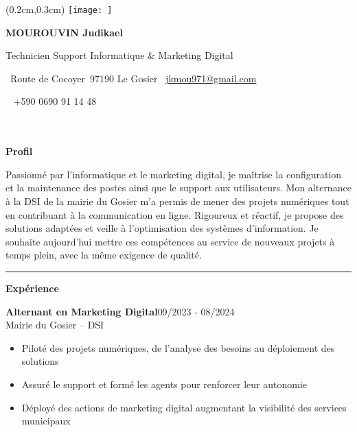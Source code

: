 \documentclass[a4paper]{article}
\renewcommand{\colorbox}[2]{#2}%
\newcommand{\fullrule}{\hspace{-1.5cm}\rule{\paperwidth}{0.4pt}}
\newcommand{\cvsection}[1]{%
  \vspace{6pt}\textbf{\Large #1}\par\vspace{2pt}}
\begin{document}
\color{white}
\ifx\relax\relax\else
\begin{textblock*}{4cm}(0.2cm,0.3cm)
  \texttt{[image: ]}
\end{textblock*}
 \fi
\begin{center}
  {\fontsize{44pt}{24pt}\selectfont\bfseries MOUROUVIN Judikael}

  \bigskip
  {\Large Technicien Support Informatique \& Marketing Digital}

  \bigskip\bigskip
  \faMapMarker~Route de Cocoyer\ 97190 Le Gosier
  \quad\faEnvelope~\href{mailto:jkmou971@gmail.com}{jkmou971@gmail.com}

  \bigskip
  \faPhone~ +590 0690 91 14 48
  \quad \faLinkedin\ \href{}{}
 

  \vspace{-0.3cm}
  
\end{center}
\\ \\
\cvsection{Profil}

Passionné par l’informatique et le marketing digital, je maîtrise la configuration et la maintenance des postes ainsi que le support aux utilisateurs. Mon alternance à la DSI de la mairie du Gosier m’a permis de mener des projets numériques tout en contribuant à la communication en ligne. Rigoureux et réactif, je propose des solutions adaptées et veille à l’optimisation des systèmes d’information. Je souhaite aujourd’hui mettre ces compétences au service de nouveaux projets à temps plein, avec la même exigence de qualité.

\medskip\fullrule

\cvsection{Expérience}
\colorbox{maincolor}{%
  \begin{minipage}{\linewidth}
    \noindent
    \textbf{Alternant en Marketing Digital}\hfill 09/2023 - 08/2024\\
    Mairie du Gosier – DSI\\[-0.3em]
    \begin{itemize}[leftmargin=*]
      \item Piloté des projets numériques, de l’analyse des besoins au déploiement des solutions \item Assuré le support et formé les agents pour renforcer leur autonomie \item Déployé des actions de marketing digital augmentant la visibilité des services municipaux
    \end{itemize}
  \end{minipage}}
\end{document}
